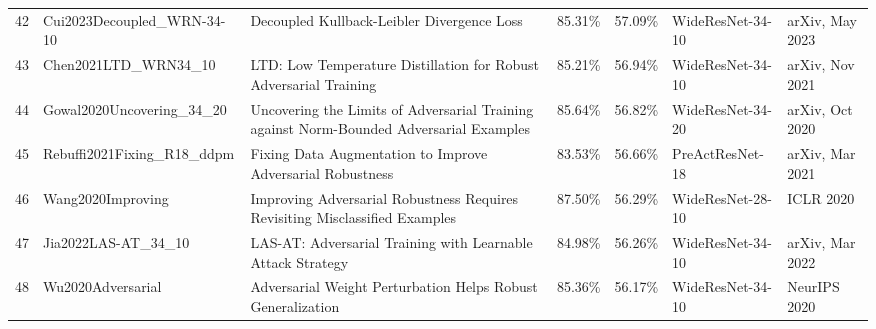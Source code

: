 \begin{table}[]
\begin{tabular}{lllllll}
    42 & Cui2023Decoupled\_WRN-34-10              & Decoupled Kullback-Leibler Divergence Loss                                                                         & 85.31\%        & 57.09\%         & WideResNet-34-10                                                  & arXiv, May 2023                                            \\
    43 & Chen2021LTD\_WRN34\_10                   & LTD: Low Temperature Distillation for Robust Adversarial Training                                                  & 85.21\%        & 56.94\%         & WideResNet-34-10                                                  & arXiv, Nov 2021                                            \\
    44 & Gowal2020Uncovering\_34\_20              & Uncovering the Limits of Adversarial Training against Norm-Bounded Adversarial Examples                            & 85.64\%        & 56.82\%         & WideResNet-34-20                                                  & arXiv, Oct 2020                                            \\
    45 & Rebuffi2021Fixing\_R18\_ddpm             & Fixing Data Augmentation to Improve Adversarial Robustness                                                         & 83.53\%        & 56.66\%         & PreActResNet-18                                                   & arXiv, Mar 2021                                            \\
    46 & Wang2020Improving                        & Improving Adversarial Robustness Requires Revisiting Misclassified Examples                                        & 87.50\%        & 56.29\%         & WideResNet-28-10                                                  & ICLR 2020                                                  \\
    47 & Jia2022LAS-AT\_34\_10                    & LAS-AT: Adversarial Training with Learnable Attack Strategy                                                        & 84.98\%        & 56.26\%         & WideResNet-34-10                                                  & arXiv, Mar 2022                                            \\
    48 & Wu2020Adversarial                        & Adversarial Weight Perturbation Helps Robust Generalization                                                        & 85.36\%        & 56.17\%         & WideResNet-34-10                                                  & NeurIPS 2020                                               \\

\end{tabular}
\end{table}
